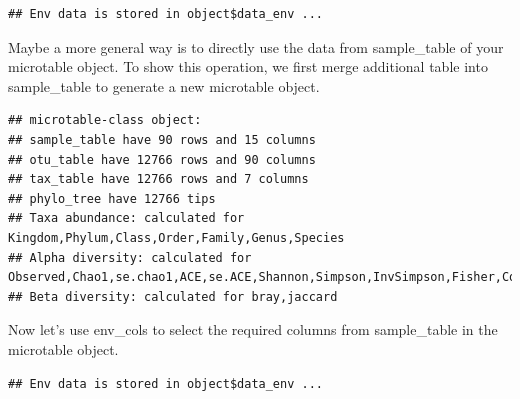 \documentclass[
]{book}
\newenvironment{Shaded}{\begin{snugshade}}{\end{snugshade}}
\newcommand{\AttributeTok}[1]{\textcolor[rgb]{0.77,0.63,0.00}{#1}}
\newcommand{\CommentTok}[1]{\textcolor[rgb]{0.56,0.35,0.01}{\textit{#1}}}
\newcommand{\DecValTok}[1]{\textcolor[rgb]{0.00,0.00,0.81}{#1}}
\newcommand{\FunctionTok}[1]{\textcolor[rgb]{0.00,0.00,0.00}{#1}}
\newcommand{\NormalTok}[1]{#1}
\newcommand{\OtherTok}[1]{\textcolor[rgb]{0.56,0.35,0.01}{#1}}
\newcommand{\SpecialCharTok}[1]{\textcolor[rgb]{0.00,0.00,0.00}{#1}}
\begin{document}
\begin{verbatim}
## Env data is stored in object$data_env ...
\end{verbatim}

Maybe a more general way is to directly use the data from sample\_table of your microtable object.
To show this operation, we first merge additional table into sample\_table to generate a new microtable object.

\begin{Shaded}
\end{Shaded}

\begin{verbatim}
## microtable-class object:
## sample_table have 90 rows and 15 columns
## otu_table have 12766 rows and 90 columns
## tax_table have 12766 rows and 7 columns
## phylo_tree have 12766 tips
## Taxa abundance: calculated for Kingdom,Phylum,Class,Order,Family,Genus,Species 
## Alpha diversity: calculated for Observed,Chao1,se.chao1,ACE,se.ACE,Shannon,Simpson,InvSimpson,Fisher,Coverage 
## Beta diversity: calculated for bray,jaccard
\end{verbatim}

Now let's use env\_cols to select the required columns from sample\_table in the microtable object.

\begin{Shaded}
\end{Shaded}

\begin{verbatim}
## Env data is stored in object$data_env ...
\end{verbatim}
\end{document}
